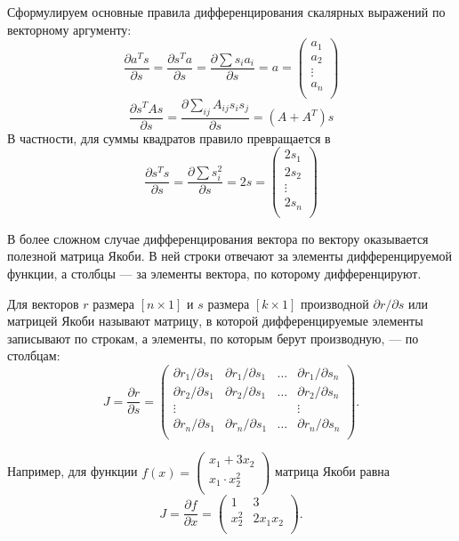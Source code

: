 \documentclass[12pt]{article}
\begin{document}
Сформулируем основные правила дифференцирования скалярных выражений по векторному аргументу:
\[
\frac{\partial a^T s}{\partial s} = \frac{\partial s^T a}{\partial s} = \frac{\partial \sum s_i a_i}{\partial s} = a = \begin{pmatrix}
    a_1 \\
    a_2 \\
    \vdots \\
    a_n \\
\end{pmatrix}
\]
\[
\frac{\partial s^T A s}{\partial s} = \frac{\partial \sum_{ij}A_{ij}s_i s_j}{\partial s} = (A + A^T)s
\]
В частности, для суммы квадратов правило превращается в 
\[
\frac{\partial s^T s}{\partial s} = \frac{\partial \sum s_i^2}{\partial s}  = 2s = \begin{pmatrix}
    2s_1 \\
    2s_2 \\
    \vdots \\
    2s_n \\
\end{pmatrix}
\]


В более сложном случае дифференцирования вектора по вектору оказывается полезной матрица Якоби.
В ней строки отвечают за элементы дифференцируемой функции, а столбцы — за элементы вектора, по которому дифференцируют. 

\begin{definition}
Для векторов $r$ размера $[n \times 1]$ и $s$ размера $[k \times 1]$ производной $\partial r/\partial s$ или матрицей Якоби называют матрицу, в которой дифференцируемые элементы записывают по строкам, а элементы, по которым берут производную, — по столбцам:
    \[
    J = \frac{\partial r}{\partial s} = \begin{pmatrix}
        \partial r_1/\partial s_1 & \partial r_1/\partial s_1 & \dots & \partial r_1/\partial s_n \\
        \partial r_2/\partial s_1 & \partial r_2/\partial s_1 & \dots & \partial r_2/\partial s_n \\
        \vdots & & & \vdots \\
        \partial r_n/\partial s_1 & \partial r_n/\partial s_1 & \dots & \partial r_n/\partial s_n \\   
    \end{pmatrix}.
    \]
\end{definition}

Например, для функции $f(x) = \begin{pmatrix}
    x_1 + 3x_2 \\
    x_1 \cdot x_2^2  \\
\end{pmatrix}$ матрица Якоби равна
\[
J = \frac{\partial f}{\partial x} = \begin{pmatrix}
    1 & 3 \\
    x_2^2 & 2x_1 x_2 \\
\end{pmatrix}.
\]
\end{document}

